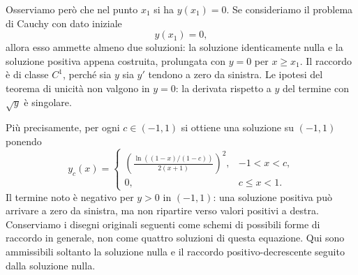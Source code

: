 \documentclass[a4paper]{article}
\begin{document}
\begin{radioactive}
\begin{snippetexample}{}
    Osserviamo però che nel punto \(x_1\) si ha \(y(x_1)=0\). Se consideriamo il problema di Cauchy con dato iniziale
    \[
        y(x_1)=0,
    \]
    allora esso ammette almeno due soluzioni: la soluzione identicamente nulla e
    la soluzione positiva appena costruita, prolungata con \(y=0\) per \(x\geq x_1\).
    Il raccordo è di classe \(C^1\), perché sia \(y\) sia \(y'\) tendono a zero
    da sinistra. Le ipotesi del teorema di unicità non valgono in \(y=0\):
    la derivata rispetto a \(y\) del termine con \(\sqrt y\) è singolare.

    Più precisamente, per ogni \(c\in(-1,1)\) si ottiene una soluzione su
    \((-1,1)\) ponendo
    \[
        y_c(x)=
        \begin{cases}
            \displaystyle\left(\frac{\ln((1-x)/(1-c))}{2(x+1)}\right)^2,
                & -1<x<c,\\[4pt]
            0,&c\leq x<1.
        \end{cases}
    \]
    Il termine noto è negativo per \(y>0\) in \((-1,1)\): una soluzione positiva
    può arrivare a zero da sinistra, ma non ripartire verso valori positivi a destra.
    Conserviamo i disegni originali seguenti come schemi di possibili forme
    di raccordo in generale, non come quattro soluzioni di questa equazione.
    Qui sono ammissibili soltanto la soluzione nulla e il raccordo
    positivo-decrescente seguito dalla soluzione nulla.

    \begin{center}
        \qquad
        \qquad
        \qquad
    \end{center}
\end{snippetexample}
\end{radioactive}
\end{document}
